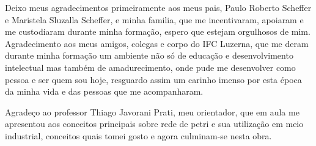 \begin{agradecimentos}
Deixo meus agradecimentos primeiramente aos meus pais, Paulo Roberto Scheffer e Maristela Sluzalla Scheffer, e minha familia, que me incentivaram, apoiaram e me custodiaram durante minha formação, espero que estejam orgulhosos de mim. Agradecimento aos meus amigos, colegas e corpo do IFC Luzerna, que me deram durante minha formação um ambiente não só de educação e desenvolvimento intelectual mas também de amadurecimento, onde pude me desenvolver como pessoa e ser quem sou hoje, resguardo assim um carinho imenso por esta época da minha vida e das pessoas que me acompanharam.

Agradeço ao professor Thiago Javorani Prati, meu orientador, que em aula me apresentou aos conceitos principais sobre rede de petri e sua utilização em meio industrial, conceitos quais tomei gosto e agora culminam-se nesta obra.

\end{agradecimentos}